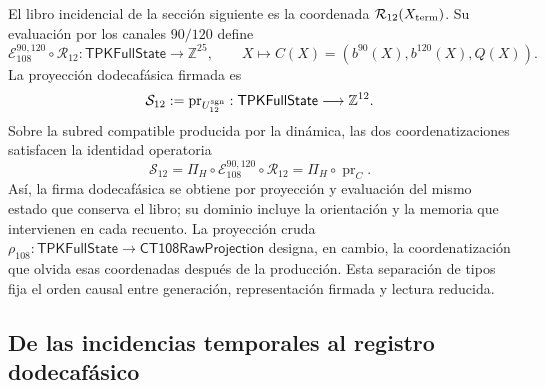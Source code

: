 El libro incidencial de la sección siguiente es la coordenada
\(\mathcal R_{12}(X_{\rm term})\). Su evaluación por los canales
\(90/120\) define
\[
 \mathcal E_{108}^{90,120}\circ\mathcal R_{12}:
 \mathsf{TPKFullState}\longrightarrow\mathbb Z^{25},
 \qquad
 X\longmapsto C(X)=(b^{90}(X),b^{120}(X),Q(X)).
\]
La proyección dodecafásica firmada es
\[
 \mathcal S_{12}:=\operatorname{pr}_{U_{12}^{\rm sgn}}:
 \mathsf{TPKFullState}\longrightarrow\mathbb Z^{12}.
\]
Sobre la subred compatible producida por la dinámica, las dos coordenatizaciones
satisfacen la identidad operatoria
\begin{equation}
 \mathcal S_{12}
 =\Pi_H\circ\mathcal E_{108}^{90,120}\circ\mathcal R_{12}
 =\Pi_H\circ\operatorname{pr}_{C}.
 \label{vi:dep:identidad-productor-e108}
\end{equation}
Así, la firma dodecafásica se obtiene por proyección y evaluación del mismo
estado que conserva el libro; su dominio incluye la orientación y la memoria
que intervienen en cada recuento. La proyección cruda
\(\rho_{108}:\mathsf{TPKFullState}\to\mathsf{CT108RawProjection}\)
designa, en cambio, la coordenatización que olvida esas coordenadas después de la
producción. Esta separación de tipos fija el orden causal entre generación,
representación firmada y lectura reducida.

\subsection{De las incidencias temporales al registro dodecafásico}
\label{vi:dep:registro}

